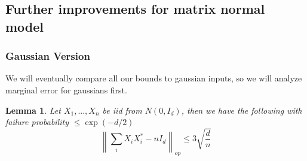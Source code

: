\documentclass[aos]{imsart}
\newtheorem{lemma}[theorem]{Lemma}
\theoremstyle{definition}
\begin{document}
\subsection{Further improvements for matrix normal model}

\subsubsection{Gaussian Version}
We will eventually compare all our bounds to gaussian inputs, so we will analyze marginal error for gaussians first.

\begin{lemma}
Let $X_{1}, ..., X_{n}$ be iid from $N(0,I_{d})$, then we have the following with failure probability $\leq \exp(-d/2)$
\[ \left\| \sum_{i} X_{i} X_{i}^{*} - n I_{d} \right\|_{op} \leq     3 \sqrt{\frac{d}{n}}  \]
\end{lemma}
\end{document}
